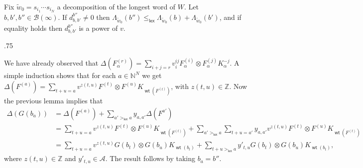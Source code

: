 \documentclass[11pt,fleqn]{article}
\makeatletter
\renewenvironment{proof}[1][\textit{Proof}]{\par
  \pushQED{\qed}%
  \normalfont \topsep.75\paraskip\relax
  \trivlist
  \item[\hskip\labelsep
        \itshape
    #1\@addpunct{.}]\ignorespaces
}{%
  \popQED\endtrivlist\@endpefalse
}
\newcommand\NN{\mathbb N}
\newcommand\ZZ{\mathbb Z}
\newcommand\ot{\otimes}
\newcommand\A{\mathcal A}
\newcommand\B{\mathcal B}
\newcommand\lex{\mathsf{lex}}
\DeclareMathOperator\wt{\mathsf{wt}}
\makeatother
\begin{document}
\begin{Proposition*}
Fix $\tilde w_0 = s_{i_1} \cdots s_{i_N}$ a decomposition of the longest word 
of $W$. Let $b,b',b'' \in \B(\infty)$. If $d_{b,b'}^{b''} \neq 0$ then 
$\Lambda_{\tilde w_0}(b'') \leq_{\lex} \Lambda_{\tilde w_0}(b) + 
\Lambda_{\tilde w_0}(b')$, and if equality holds then $d_{b,b'}^{b''}$
is a power of $v$.
\end{Proposition*}
\begin{proof}
We have already observed that $\Delta(F_\alpha^{(r)}) = \sum_{i+j = r} v_i^{ij}
F_\alpha^{(i)} \ot F_\alpha^{(j)} K^{-j}_\alpha$. A simple induction shows 
that for each $a \in \NN^N$ we get $\Delta(F^{(a)}) = \sum_{t+u = a} v^{z(t,u)}
F^{(t)} \ot F^{(u)}K_{\wt(F^{(t)})}$, with $z(t,u) \in \ZZ$. Now the previous 
lemma implies that
\begin{align*}
\Delta(G(b_a))
  &= \Delta(F^{(a)}) + \sum_{a' >_{\lex} a} y_{a,a'} \Delta(F^{a'}) \\
  &= \sum_{t+u = a} v^{z(t,u)} F^{(t)} \ot F^{(u)}K_{\wt(F^{(t)})} 
  + \sum_{a' >_{\lex} a} \sum_{t+u = a'} y_{a,a'} v^{z(t,u)} F^{(t)}
    \ot F^{(u)}K_{\wt(F^{(t)})}\\
  &= \sum_{t+u = a} v^{z(t,u)} G(b_t) \ot G(b_u) K_{\wt(b_t)}
    + \sum_{t+u >_{\lex} a} y'_{t,u} G(b_t) \ot G(b_u) K_{\wt(b_t)},
\end{align*}
where $z(t,u) \in \ZZ$ and $y'_{t,u} \in \A$. The result follows by taking 
$b_a = b''$.
\end{proof}
\end{document}
